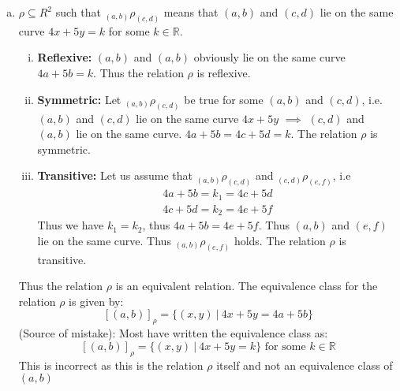 \documentclass[12pt]{scrartcl}
\begin{document}
\begin{enumerate}[a.]
    \item $\rho \subseteq R^2$ such that $_{(a, b)}\rho_{(c,d)}$ means that $(a,b)$ and $(c,d)$ lie on the same curve $4x + 5y = k$ for some $k \in \mathbb{R}$. 
        \begin{enumerate}[i.]
            \item \textbf{Reflexive:} $(a, b)$ and $(a,b)$ obviously lie on the same curve $4a + 5b = k$. Thus the relation $\rho$ is reflexive.
            \item \textbf{Symmetric:} Let $_{(a,b)}\rho_{(c,d)}$ be true for some $(a, b)$ and $(c, d)$, i.e. $(a,b)$ and $(c,d)$ lie on the same curve $4x + 5y$ $\implies$ $(c,d)$ and $(a,b)$ lie on the same curve. $4a + 5b = 4c + 5d = k$. The relation $\rho$ is symmetric.
            \item \textbf{Transitive:} Let us assume that $_{(a,b)}\rho_{(c,d)}$ and $_{(c,d)}\rho_{(e,f)}$, i.e 
            \begin{gather*}
                4a + 5b = k_1 = 4c + 5d \\
                4c + 5d = k_2 = 4e + 5f
            \end{gather*}
            Thus we have $k_1 = k_2$, thus $4a + 5b = 4e + 5f$. Thus $(a, b)$ and $(e, f)$ lie on the same curve. Thus $_{(a,b)}\rho_{(e,f)}$ holds. The relation $\rho$ is transitive. 
        \end{enumerate}
    Thus the relation $\rho$ is an equivalent relation. The equivalence class for the relation $\rho$ is given by: 
    \[
        [(a, b)]_\rho = \{(x, y)\  |\  4x + 5y = 4a + 5b\}
    \]
    (Source of mistake): Most have written the equivalence class as: 
    \[
        [(a, b)]_\rho = \{(x, y)\  |\  4x + 5y = k\} \text{ for some $k \in \mathbb{R}$}
    \]
    This is incorrect as this is the relation $\rho$ itself and not an equivalence class of $(a,b)$
    

\end{enumerate}
\end{document}

